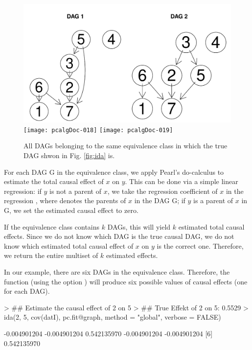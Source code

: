 \documentclass[article]{jss}
\begin{document}
\begin{figure}
  \begin{center}
\includegraphics{pcalgDoc-017}
\texttt{[image: pcalgDoc-018]}
\texttt{[image: pcalgDoc-019]}
\caption{All DAGs belonging to the same equivalence class in which the true
  DAG shwon in Fig. \ref{fig:ida} is.}
\label{fig:allDags}
\end{center}
\end{figure}

For each DAG G in the equivalence class, we apply Pearl's do-calculus to
estimate the total causal effect of $x$ on $y$. This can be done via a
simple linear regression: if $y$ is not a parent of $x$, we take the
regression coefficient of $x$ in the regression , where  denotes the parents of $x$ in the DAG G; if
$y$ is a parent of $x$ in G, we set the estimated causal effect to zero.

If the equivalence class contains $k$ DAGs, this will yield $k$ estimated
total causal effects. Since we do not know which DAG is the true causal
DAG, we do not know which estimated total causal effect of $x$ on $y$ is
the correct one. Therefore, we return the entire multiset of $k$ estimated
effects.

In our example, there are six DAGs in the equivalence class. Therefore, the
function  (using the option ) will
produce six possible values of causal effects (one for each DAG).

\begin{Schunk}
\begin{Sinput}
> ## Estimate the causal effect of 2 on 5
> ## True Effekt of 2 on 5: 0.5529
>      ida(2, 5, cov(datI), pc.fit@graph, method = "global", verbose = FALSE)
\end{Sinput}
\begin{Soutput}
[1] -0.004901204 -0.004901204  0.542135970 -0.004901204 -0.004901204
[6]  0.542135970
\end{Soutput}
\end{Schunk}
\end{document}
